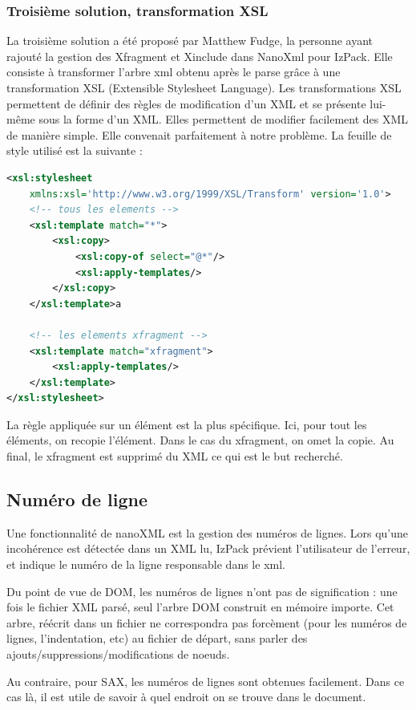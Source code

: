 \subsubsection{Troisième solution, transformation XSL}
La troisième solution a été proposé par Matthew Fudge, la personne ayant rajouté la gestion des Xfragment et Xinclude dans NanoXml pour IzPack.
Elle consiste à transformer l'arbre xml obtenu après le parse grâce à une transformation XSL (Extensible Stylesheet Language).
Les transformations XSL permettent de définir des règles de modification d'un XML et se présente lui-même sous la forme d'un XML.
Elles permettent de modifier facilement des XML de manière simple.
Elle convenait parfaitement à notre problème.
La feuille de style utilisé est la suivante :
\begin{lstlisting}[language=xml]
<xsl:stylesheet 
	xmlns:xsl='http://www.w3.org/1999/XSL/Transform' version='1.0'>
    <!-- tous les elements -->
    <xsl:template match="*">
        <xsl:copy>
            <xsl:copy-of select="@*"/>
            <xsl:apply-templates/>
        </xsl:copy>
    </xsl:template>a

    <!-- les elements xfragment -->
    <xsl:template match="xfragment">
        <xsl:apply-templates/>
    </xsl:template>
</xsl:stylesheet>
\end{lstlisting}

La règle appliquée sur un élément est la plus spécifique.
Ici, pour tout les éléments, on recopie l'élément.
Dans le cas du xfragment, on omet la copie.
Au final, le xfragment est supprimé du XML ce qui est le but recherché.
\subsection{Numéro de ligne}
Une fonctionnalité de nanoXML est la gestion des numéros de lignes. 
Lors qu'une incohérence est détectée dans un XML lu, IzPack prévient l'utilisateur de l'erreur, et indique le numéro de la ligne responsable dans le xml.

Du point de vue de DOM, les numéros de lignes n'ont pas de signification : une fois le fichier XML parsé, seul l'arbre DOM construit en mémoire importe. 
Cet arbre, réécrit dans un fichier ne correspondra pas forcèment (pour les numéros de lignes, l'indentation, etc) au fichier de départ, sans parler des ajouts/suppressions/modifications de noeuds.

Au contraire, pour SAX, les numéros de lignes sont obtenues facilement.
Dans ce cas là, il est utile de savoir à quel endroit on se trouve dans le document.

